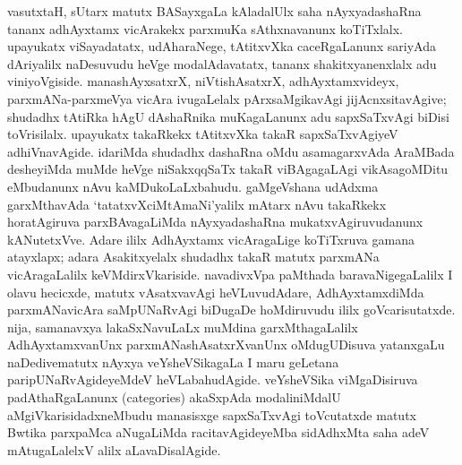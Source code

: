 vasutxtaH, sUtarx matutx BASayxgaLa kAladalUlx saha nAyxyadashaRna tananx \hbox{adhAyxtamx} vicArakekx parxmuKa sAthxnavanunx koTiTxlalx. upayukatx viSayadatatx, udAharaNege, tAtitxvXka caceRgaLanunx sariyAda dAriyalilx naDesuvudu heVge modalAdavatatx, tananx shakitxyanenxlalx adu viniyoVgiside. manashAyxsatxrX, niVtishAsatxrX, adhAyxtamxvideyx, parxmANa-parxmeVya vicAra ivugaLelalx pArxsaMgikavAgi jijAcnxsitavAgive; shudadhx tAtiRka hAgU dAshaRnika muKagaLanunx adu sapxSaTxvAgi biDisi toVrisilalx. upayukatx takaRkekx tAtitxvXka takaR sapxSaTxvAgiyeV adhiVnavAgide. idariMda shudadhx dashaRna oMdu asa\-magarxvAda AraMBada desheyiMda muMde heVge niSakxqqSaTx takaR viBAgagaLAgi vikAsa\-goMDitu eMbudanunx nAvu kaMDukoLaLxbahudu. gaMgeVshana udAdxma garxMthavAda `tatatxvXciMtAmaNi'yalilx mAtarx nAvu takaRkekx horatAgiruva parxBAvagaLiMda nAyxya\-dashaRna mukatxvAgiruvudanunx kANutetxVve. Adare ililx AdhAyxtamx vicAragaLige koTiTx\-ruva gamana atayxlapx; adara Asakitxyelalx shudadhx takaR matutx parxmANa vicAragaLalilx keVMdirxVkariside. navadivxVpa paMthada baravaNigegaLalilx I olavu hecicxde, matutx vAsatxva\-vAgi heVLuvudAdare, AdhAyxtamxdiMda parxmANavicAra saMpUNaRvAgi biDugaDe hoMdiruvudu ililx goVcarisutatxde. nija, samanavxya lakaSxNavuLaLx muMdina garxMtha\-gaLalilx AdhAyxtamxvanUnx parxmANashAsatxrXvanUnx oMdugUDisuva yatanxgaLu naDedive\break matutx nAyxya veYsheVSikagaLa I maru geLetana paripUNaRvAgideyeMdeV heVLa\-bahu\-dAgide. veYsheVSika viMgaDisiruva padAthaRgaLanunx ({\rm categories}) akaSxpAda moda\-liniMdalU aMgiVkarisidadxneMbudu manasisxge sapxSaTxvAgi toVcutatxde matutx Bwtika parxpaMca aNugaLiMda racitavAgideyeMba sidAdhxMta saha adeV mAtugaLalelxV alilx aLavaDisalAgide.

